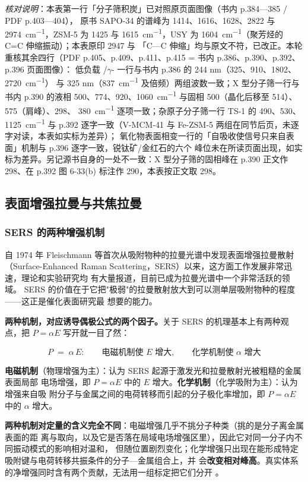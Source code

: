 \emph{核对说明}：本表第一行「分子筛积炭」已对照原页面图像（书内 p.384—385 / PDF p.403—404），
原书 SAPO-34 的谱峰为 1414、1616、1628、2822 与 \qty{2974}{cm^{-1}}，ZSM-5 为 1425 与
\qty{1615}{cm^{-1}}，USY 为 \qty{1604}{cm^{-1}}（聚芳烃的 C=C 伸缩振动）；本表原印 2947 与
「C—C 伸缩」均与原文不符，已改正。本轮重核其余四行（PDF p.405、p.409、p.411、p.415 = 书内 p.386、p.390、p.392、p.396 页面图像）：
低负载 /$\gamma$- 一行与书内 p.386 的 244 nm（325、910、1802、\qty{2720}{cm^{-1}}）
与 325 nm（\qty{837}{cm^{-1}} 及倍频）两组波数一致；X 型分子筛一行与书内 p.390 的液相
500、774、920、\qty{1060}{cm^{-1}} 与固相 500（晶化后移至 514）、575（肩峰）、298、
\qty{380}{cm^{-1}} 逐项一致；杂原子分子筛一行 TS-1 的 490、530、\qty{1125}{cm^{-1}} 与
p.392 逐字一致（V-MCM-41 与 Fe-ZSM-5 两组在同节后页，未逐字对读，本表如实标为差异）；
氧化物表面相变一行的「自吸收使信号只来自表面」机制与 p.396 逐字一致，锐钛矿/金红石的六个
峰位未在所读页面出现，如实标为差异。另记源书自身的一处不一致：X 型分子筛的固相峰在 p.390
正文作 298、在 p.392 图 6-33(b) 标注作 290，本表按正文取 298。

\subsection{表面增强拉曼与共焦拉曼}

\subsubsection{SERS 的两种增强机制}

自 1974 年 Fleischmann 等首次从吸附物种的拉曼光谱中发现表面增强拉曼散射
（Surface-Enhanced Raman Scattering，SERS）以来，这方面工作发展非常迅速，理论和实验研究均
有大量报道，目前已成为拉曼光谱中一个非常活跃的领域。
SERS 的价值在于它把"极弱"的拉曼散射放大到可以测单层吸附物种的程度——这正是催化表面研究最
想要的能力。

\begin{principle}
\textbf{两种机制，对应诱导偶极公式的两个因子。}关于 SERS 的机理基本上有两种观点，把
$P=\alpha E$ 写开就一目了然：

\begin{equation}
P \;=\; \alpha\,E:\qquad
\text{电磁机制使 } E \text{ 增大},\qquad
\text{化学机制使 } \alpha \text{ 增大}
\label{eq:sers-two}
\end{equation}

\textbf{电磁机制}（物理增强为主）：认为 SERS 起源于激发光和拉曼散射光被粗糙的金属表面局部
电场增强，即 $P=\alpha E$ 中的 $E$ 增大。\textbf{化学机制}（化学吸附为主）：认为增强来自吸
附分子与金属之间的电荷转移而引起的分子极化率增加，即 $P=\alpha E$ 中的 $\alpha$ 增大。

\textbf{两种机制对定量的含义完全不同}：电磁增强几乎不挑分子种类（挑的是分子离金属表面的距
离与取向，以及它是否落在局域电场增强区里），因此它对同一分子内不同振动模式的影响相对温和，
但随位置剧烈变化；化学增强只出现在能形成特定吸附键与电荷转移共振条件的分子—金属组合上，并
会\textbf{改变相对峰高}。真实体系的净增强同时含有两个贡献，无法用一组标定把它们分开
。
\end{principle}

